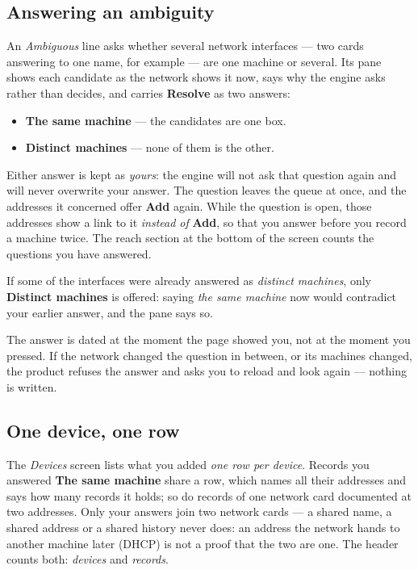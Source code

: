 \documentclass[11pt,oneside,listof=totoc,bibliography=totoc]{scrreprt}
\begin{document}
\subsection{Answering an ambiguity}
An \emph{Ambiguous} line asks whether several network interfaces --- two cards answering to
one name, for example --- are one machine or several. Its pane shows each candidate as the
network shows it now, says why the engine asks rather than decides, and carries
\textbf{Resolve} as two answers:
\begin{itemize}
  \item \textbf{The same machine} --- the candidates are one box.
  \item \textbf{Distinct machines} --- none of them is the other.
\end{itemize}
Either answer is kept as \emph{yours}: the engine will not ask that question again and will
never overwrite your answer. The question leaves the queue at once, and the addresses it
concerned offer \textbf{Add} again. While the question is open, those addresses show a link
to it \emph{instead of} \textbf{Add}, so that you answer before you record a machine twice.
The reach section at the bottom of the screen counts the questions you have answered.

If some of the interfaces were already answered as \emph{distinct machines}, only
\textbf{Distinct machines} is offered: saying \emph{the same machine} now would contradict your
earlier answer, and the pane says so.

\begin{note}
The answer is dated at the moment the page showed you, not at the moment you pressed. If the
network changed the question in between, or its machines changed, the product refuses the
answer and asks you to reload and look again --- nothing is written.
\end{note}

\subsection{One device, one row}
The \emph{Devices} screen lists what you added \emph{one row per device}. Records you answered
\textbf{The same machine} share a row, which names all their addresses and says how many records it
holds; so do records of one network card documented at two addresses. Only your answers join two
network cards --- a shared name, a shared address or a shared history never does: an address the
network hands to another machine later (DHCP) is not a proof that the two are one. The header counts
both: \emph{devices} and \emph{records}.
\end{document}
